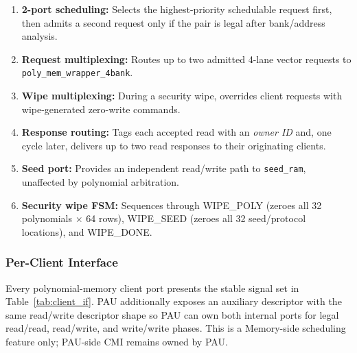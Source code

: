 \documentclass[11pt,letterpaper]{article}
\begin{document}
\begin{enumerate}
  \item \textbf{2-port scheduling:} Selects the highest-priority
    schedulable request first, then admits a second request only if the
    pair is legal after bank/address analysis.
  \item \textbf{Request multiplexing:} Routes up to two admitted 4-lane
    vector requests to \texttt{poly\_mem\_wrapper\_4bank}.
  \item \textbf{Wipe multiplexing:} During a security wipe, overrides
    client requests with wipe-generated zero-write commands.
  \item \textbf{Response routing:} Tags each accepted read with an
    \emph{owner ID} and, one cycle later, delivers up to two read
    responses to their originating clients.
  \item \textbf{Seed port:} Provides an independent read/write path
    to \texttt{seed\_ram}, unaffected by polynomial arbitration.
  \item \textbf{Security wipe FSM:} Sequences through WIPE\_POLY
    (zeroes all 32 polynomials $\times$ 64 rows), WIPE\_SEED (zeroes
    all 32 seed/protocol locations), and WIPE\_DONE.
\end{enumerate}

\subsubsection{Per-Client Interface}

Every polynomial-memory client port presents the stable signal set in
Table~\ref{tab:client_if}. PAU additionally exposes an auxiliary descriptor
with the same read/write descriptor shape so PAU can own both internal ports
for legal read/read, read/write, and write/write phases. This is a Memory-side
scheduling feature only; PAU-side CMI remains owned by PAU.
\end{document}
